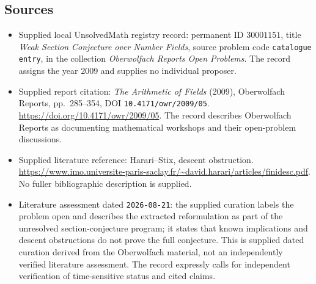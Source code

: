 \documentclass[11pt]{article}
\begin{document}
\subsection{Sources}
\begin{itemize}
\item Supplied local UnsolvedMath registry record: permanent ID \(30001151\), title \emph{Weak Section Conjecture over Number Fields}, source problem code \texttt{catalogue entry}, in the collection \emph{Oberwolfach Reports Open Problems}. The record assigns the year 2009 and supplies no individual proposer.
\item Supplied report citation: \emph{The Arithmetic of Fields} (2009), Oberwolfach Reports, pp.\ 285--354, DOI \texttt{10.4171/owr/2009/05}. \url{https://doi.org/10.4171/owr/2009/05}. The record describes Oberwolfach Reports as documenting mathematical workshops and their open-problem discussions.
\item Supplied literature reference: Harari--Stix, descent obstruction. \url{https://www.imo.universite-paris-saclay.fr/~david.harari/articles/finidesc.pdf}. No fuller bibliographic description is supplied.
\item Literature assessment dated \texttt{2026-08-21}: the supplied curation labels the problem open and describes the extracted reformulation as part of the unresolved section-conjecture program; it states that known implications and descent obstructions do not prove the full conjecture. This is supplied dated curation derived from the Oberwolfach material, not an independently verified literature assessment. The record expressly calls for independent verification of time-sensitive status and cited claims.
\end{itemize}
\end{document}
